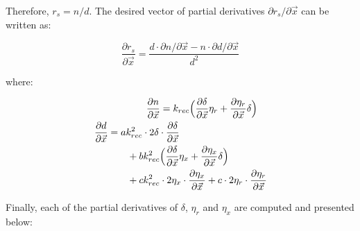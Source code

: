 \documentclass[conference, twocolumn, letterpaper]{IEEEtran}
\begin{document}
Therefore, $r_s = n/d$. The desired vector of partial derivatives $\partial r_s/\partial\vec{x}$ can be written as:

\vspace{-0.2cm}
\begin{equation}
\label{eqn:drs_dx}
\frac{\partial r_s}{\partial\vec{x}} = \frac{d \cdot \partial n / \partial \vec{x} - n \cdot \partial d / \partial\vec{x}}{d^2}
\end{equation}

where:

\vspace{-0.2cm}
\begin{subequations}
	\begin{align}
	    \begin{split}
	      \frac{\partial n}{\partial \vec{x}} 
	      	&= k_{rec} \Bigr(\frac{\partial \delta}{\partial \vec{x}} \eta_r	      	
	      		+ \frac{\partial \eta_r}{\partial \vec{x}} \delta\Bigl)
	    \end{split}
	    \label{eqn:dn_dx}
	    \\
	    \begin{split}
	      \frac{\partial d}{\partial \vec{x}} 
	      	&= ak_{rec}^2\cdot 2 \delta \cdot \frac{\partial \delta}{\partial \vec{x}}
	      \\
	        & \begin{aligned}[t]
	           & \qquad + bk_{rec}^2\Bigr(\frac{\partial \delta}{\partial \vec{x}} \eta_x 
	           	 + \frac{\partial \eta_x}{\partial \vec{x}} \delta\Bigl)
			   \\& 
			     \qquad + ck_{rec}^2 \cdot 2\eta_x \cdot \frac{\partial \eta_x}{\partial \vec{x}}
			     + c \cdot 2\eta_r \cdot \frac{\partial \eta_r}{\partial \vec{x}}
	      \end{aligned}
	    \end{split}
	    \label{eqn:dd_dx}
	\end{align} 
\end{subequations}

Finally, each of the partial derivatives of $\delta$, $\eta_r$ and $\eta_x$ are computed and presented below:
\end{document}
